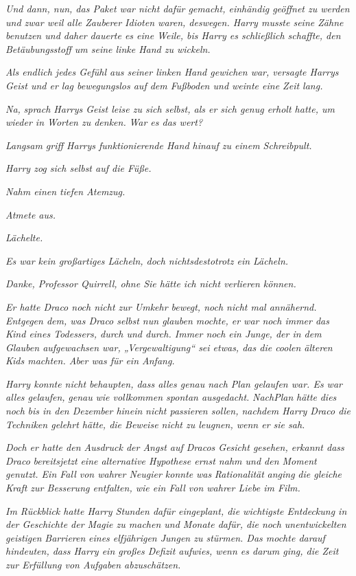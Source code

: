 {\emph{Und dann, nun, das Paket war nicht dafür gemacht, einhändig geöffnet zu werden und zwar weil alle Zauberer Idioten waren, deswegen. Harry musste seine Zähne benutzen und daher dauerte es eine Weile, bis Harry es schließlich schaffte, den Betäubungsstoff um seine linke Hand zu wickeln.}

\emph{Als endlich jedes Gefühl aus seiner linken Hand gewichen war, versagte Harrys Geist und er lag bewegungslos auf dem Fußboden und weinte eine Zeit lang.}

\emph{\emph{N}\emph{a}\emph{,}} \emph{sprach Harrys Geist leise zu sich selbst, als er sich genug erholt hatte, um wieder in Worten zu denken.} \emph{\emph{War es das wert?}}

\emph{Langsam griff Harrys funktionierende Hand hinauf zu einem Schreibpult.}

\emph{Harry zog sich selbst auf die Füße.}

\emph{Nahm einen tiefen Atemzug.}

\emph{Atmete aus.}

\emph{Lächelte.}

\emph{Es war kein großartiges Lächeln, doch nichtsdestotrotz ein Lächeln.}

\emph{\emph{Danke, Professor Quirrell, ohne Sie hätte ich nicht verlieren können.}}

\emph{Er hatte Draco noch nicht zur Umkehr bewegt, noch nicht mal annähernd. Entgegen dem, was Draco selbst nun glauben mochte, er war noch immer das Kind eines Todessers, durch und durch. Immer noch ein Junge, der in dem Glauben aufgewachsen war, „Vergewaltigung“ sei etwas, das die coolen älteren Kids machten. Aber was für ein Anfang.}

\emph{Harry konnte nicht behaupten, dass alles genau nach Plan gelaufen war. Es war alles gelaufen,} \emph{genau} \emph{wie vollkommen spontan ausgedacht.} \emph{Nach\emph{Plan}} \emph{hätte} \emph{dies} \emph{noch} \emph{bis in den Dezember hinein} \emph{nicht passieren sollen, nachdem Harry Draco die Techniken gelehrt hätte, die Beweise nicht zu leugnen, wenn er sie sah.}

\emph{Doch er hatte den Ausdruck der Angst auf Dracos Gesicht gesehen, erkannt dass Draco} \emph{\emph{bereits}\emph{jetzt}} \emph{eine alternative Hypothese ernst nahm und den Moment genutzt. Ein Fall von wahrer Neugier konnte} \emph{was} \emph{Rationalität} \emph{anging} \emph{die gleiche Kraft zur Besserung entfalten, wie ein Fall von wahrer Liebe im Film.}

\emph{Im Rückblick hatte Harry Stunden dafür eingeplant, die wichtigste Entdeckung in der Geschichte der Magie zu machen und Monate dafür, die noch unentwickelten geistigen} \emph{Barrieren} \emph{eines elfjährigen Jungen zu stürmen. Das mochte darauf hindeuten, dass Harry ein großes Defizit aufwies, wenn es darum ging, die Zeit zur Erfüllung von Aufgaben abzuschätzen.}

}
